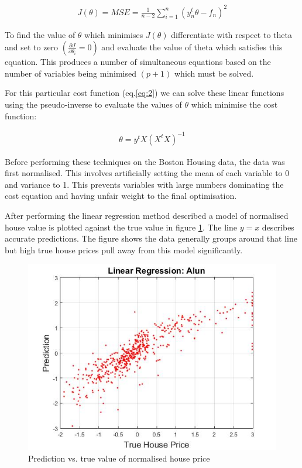 \documentclass[a4paper,11pt, twocolumn]{article}
\begin{document}
\begin{align}
	J(\theta) = MSE = \frac{1}{n-2}  \sum^n_{i=1} (y_n^t\theta - f_n)^2
	\label{eq:2}
\end{align}

To find the value of $\theta$ which minimises $J(\theta)$ differentiate with respect to theta and set to zero $ (\frac{\partial J}{\partial \theta_i} = 0)$ and evaluate the value of theta which satisfies this equation. This produces a number of simultaneous equations based on the number of variables being minimised $(p+1)$ which must be solved. 

For this particular cost function (eq.\ref{eq:2}) we can solve these linear functions using the pseudo-inverse to evaluate the values of $\theta$ which minimise the cost function:

\begin{align}
	\theta = y^tX(X^tX)^{-1}
	\label{eq:3}
\end{align}

Before performing these techniques on the Boston Housing data, the data was first normalised. This involves artificially setting the mean of each variable to 0 and variance to 1. This prevents variables with large numbers dominating the cost equation and having unfair weight to the final optimisation. 

After performing the linear regression method described a model of normalised house value is plotted against the true value in figure \ref{fig:1}. The line $y=x$ describes accurate predictions. The figure shows the data generally groups around that line but high true house prices pull away from this model significantly. 

\begin{figure}[ht]
	\includegraphics[width=0.8\linewidth]{figure1.jpg}
	\centering
	\caption{Prediction vs. true value of normalised house price}
		\label{fig:1}
\end{figure}
\end{document}
